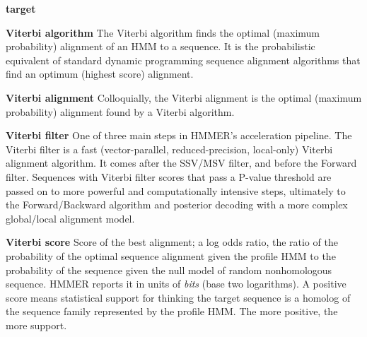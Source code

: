 \begin{wideitem}
\item[\textbf{target}]

\item[\textbf{Viterbi algorithm}] The Viterbi algorithm finds the
  optimal (maximum probability) alignment of an HMM to a sequence. It
  is the probabilistic equivalent of standard dynamic programming
  sequence alignment algorithms that find an optimum (highest score)
  alignment.

\item[\textbf{Viterbi alignment}] Colloquially, the Viterbi alignment
  is the optimal (maximum probability) alignment found by a Viterbi
  algorithm.

\item[\textbf{Viterbi filter}] One of three main steps in HMMER's
  acceleration pipeline. The Viterbi filter is a fast
  (vector-parallel, reduced-precision, local-only) Viterbi alignment
  algorithm. It comes after the SSV/MSV filter, and before the Forward
  filter. Sequences with Viterbi filter scores that pass a P-value
  threshold are passed on to more powerful and computationally
  intensive steps, ultimately to the Forward/Backward algorithm and
  posterior decoding with a more complex global/local alignment
  model.
  
\item[\textbf{Viterbi score}] Score of the best alignment; a log odds
  ratio, the ratio of the probability of the optimal sequence
  alignment given the profile HMM to the probability of the sequence
  given the null model of random nonhomologous sequence. HMMER reports
  it in units of \emph{bits} (base two logarithms). A positive score
  means statistical support for thinking the target sequence is a
  homolog of the sequence family represented by the profile HMM. The
  more positive, the more support. 





\end{wideitem}

